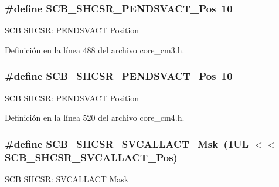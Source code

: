 \subsubsection[{\texorpdfstring{S\+C\+B\+\_\+\+S\+H\+C\+S\+R\+\_\+\+P\+E\+N\+D\+S\+V\+A\+C\+T\+\_\+\+Pos}{SCB_SHCSR_PENDSVACT_Pos}}]{\setlength{\rightskip}{0pt plus 5cm}\#define S\+C\+B\+\_\+\+S\+H\+C\+S\+R\+\_\+\+P\+E\+N\+D\+S\+V\+A\+C\+T\+\_\+\+Pos~10}\hypertarget{group___c_m_s_i_s___s_c_b_ga9b9fa69ce4c5ce7fe0861dbccfb15939}{}\label{group___c_m_s_i_s___s_c_b_ga9b9fa69ce4c5ce7fe0861dbccfb15939}
S\+CB S\+H\+C\+SR\+: P\+E\+N\+D\+S\+V\+A\+CT Position 

Definición en la línea 488 del archivo core\+\_\+cm3.\+h.

\subsubsection[{\texorpdfstring{S\+C\+B\+\_\+\+S\+H\+C\+S\+R\+\_\+\+P\+E\+N\+D\+S\+V\+A\+C\+T\+\_\+\+Pos}{SCB_SHCSR_PENDSVACT_Pos}}]{\setlength{\rightskip}{0pt plus 5cm}\#define S\+C\+B\+\_\+\+S\+H\+C\+S\+R\+\_\+\+P\+E\+N\+D\+S\+V\+A\+C\+T\+\_\+\+Pos~10}\hypertarget{group___c_m_s_i_s___s_c_b_ga9b9fa69ce4c5ce7fe0861dbccfb15939}{}\label{group___c_m_s_i_s___s_c_b_ga9b9fa69ce4c5ce7fe0861dbccfb15939}
S\+CB S\+H\+C\+SR\+: P\+E\+N\+D\+S\+V\+A\+CT Position 

Definición en la línea 520 del archivo core\+\_\+cm4.\+h.

\subsubsection[{\texorpdfstring{S\+C\+B\+\_\+\+S\+H\+C\+S\+R\+\_\+\+S\+V\+C\+A\+L\+L\+A\+C\+T\+\_\+\+Msk}{SCB_SHCSR_SVCALLACT_Msk}}]{\setlength{\rightskip}{0pt plus 5cm}\#define S\+C\+B\+\_\+\+S\+H\+C\+S\+R\+\_\+\+S\+V\+C\+A\+L\+L\+A\+C\+T\+\_\+\+Msk~(1\+U\+L $<$$<$ S\+C\+B\+\_\+\+S\+H\+C\+S\+R\+\_\+\+S\+V\+C\+A\+L\+L\+A\+C\+T\+\_\+\+Pos)}\hypertarget{group___c_m_s_i_s___s_c_b_ga634c0f69a233475289023ae5cb158fdf}{}\label{group___c_m_s_i_s___s_c_b_ga634c0f69a233475289023ae5cb158fdf}
S\+CB S\+H\+C\+SR\+: S\+V\+C\+A\+L\+L\+A\+CT Mask 

